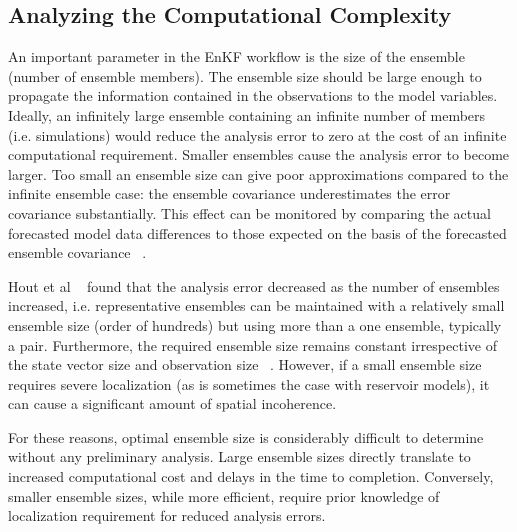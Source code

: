 \documentclass{acm_proc_article-sp}
\begin{document}
\subsection{Analyzing the Computational Complexity}



An important parameter in the EnKF workflow is the size of the
ensemble (number of ensemble members). The ensemble size should be
large enough to propagate the information contained in the
observations to the model variables. Ideally, an infinitely large ensemble containing
an infinite number of members (i.e. simulations) would reduce the analysis
error to zero at the cost of an infinite computational requirement. Smaller ensembles cause the
analysis error to become larger. Too small an ensemble size can give
poor approximations compared to the infinite ensemble case: the ensemble
covariance underestimates the error covariance substantially. This
effect can be monitored by comparing the actual forecasted model data
differences to those expected on the basis of the forecasted ensemble
covariance ~\cite{Burger98}.

Hout et al ~\cite{Hout98} found that the analysis error
decreased as the number of ensembles increased, i.e. representative
ensembles can be maintained with a relatively small ensemble size
(order of hundreds) but using more than a one ensemble, typically a pair. Furthermore, the
required ensemble size remains constant irrespective of the state
vector size and observation size ~\cite{Mitchell02}. However, if a
small ensemble size requires severe localization (as is sometimes the
case with reservoir models), it can cause a significant amount of
spatial incoherence.

For these reasons, optimal ensemble size is considerably difficult to
determine without any preliminary analysis. Large ensemble sizes
directly translate to increased computational cost and delays in the
time to completion. Conversely, smaller ensemble sizes, while more
efficient, require prior knowledge of localization requirement for
reduced analysis errors.
\end{document}
